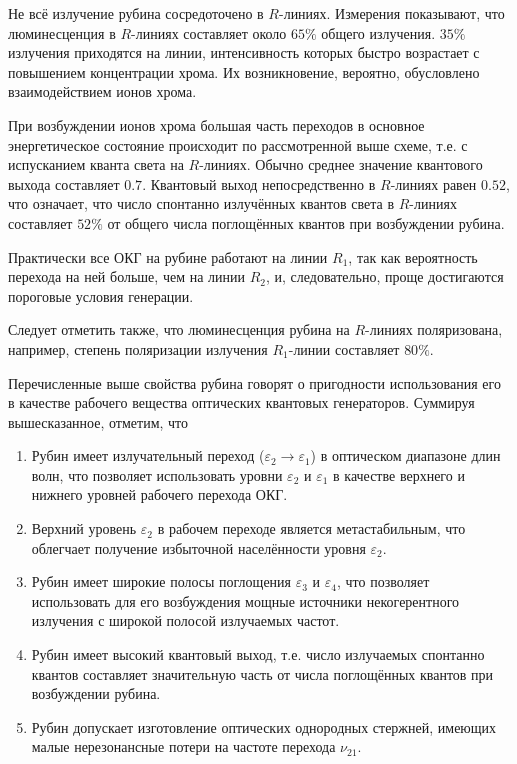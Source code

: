 \documentclass[a4paper,14pt,russian]{article}
\begin{document}
Не всё излучение рубина сосредоточено в $R$-линиях. Измерения показывают, что люминесценция в $R$-линиях составляет около $65\%$ общего излучения. $35\%$ излучения приходятся на линии, интенсивность которых быстро возрастает с повышением концентрации хрома. Их возникновение, вероятно, обусловлено взаимодействием ионов хрома.

При возбуждении ионов хрома большая часть переходов в основное энергетическое состояние происходит по рассмотренной выше схеме, т.е. с испусканием кванта света на $R$-линиях. Обычно среднее значение квантового выхода составляет $0.7$. Квантовый выход непосредственно в $R$-линиях равен $0.52$, что означает, что число спонтанно излучённых квантов света в $R$-линиях составляет $52\%$ от общего числа поглощённых квантов при возбуждении рубина.

Практически все ОКГ на рубине работают на линии $R_1$, так как вероятность перехода на ней больше, чем на линии $R_2$, и, следовательно, проще достигаются пороговые условия генерации.

Следует отметить также, что люминесценция рубина на $R$-линиях поляризована, например, степень поляризации излучения $R_1$-линии составляет $80\%$.

Перечисленные выше свойства рубина говорят о пригодности использования его в качестве рабочего вещества оптических квантовых генераторов. Суммируя вышесказанное, отметим, что

\begin{enumerate}
\item  Рубин имеет излучательный переход ($\varepsilon_2 \to \varepsilon_1$) в оптическом диапазоне длин волн, что позволяет использовать уровни $\varepsilon_2$ и $\varepsilon_1$ в качестве верхнего и нижнего уровней рабочего перехода ОКГ.
\item  Верхний уровень $\varepsilon_2$ в рабочем переходе является метастабильным, что облегчает получение избыточной населённости уровня $\varepsilon_2$.
\item  Рубин имеет широкие полосы поглощения $\varepsilon_3$ и $\varepsilon_4$, что позволяет использовать для его возбуждения мощные источники некогерентного излучения с широкой полосой излучаемых частот.
\item  Рубин имеет высокий квантовый выход, т.е. число излучаемых спонтанно квантов составляет значительную часть от числа поглощённых квантов при возбуждении рубина.
\item  Рубин допускает изготовление оптических однородных стержней, имеющих малые нерезонансные потери на частоте перехода $\nu_{21}$.
\end{enumerate}
\end{document}
